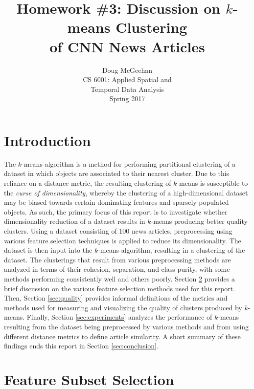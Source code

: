 \documentclass[11pt]{article}
\title{Homework \#3: Discussion on $k$-means Clustering\\ of CNN News Articles}
\author{Doug McGeehan\\
		CS 6001: Applied Spatial and \\ Temporal Data Analysis\\
		Spring 2017}
\begin{document}
\maketitle

\section{Introduction}

The $k$-means algorithm is a method for performing partitional clustering of a dataset in which objects are associated to their nearest cluster.
Due to this reliance on a distance metric, the resulting clustering of $k$-means is susceptible to the \emph{curse of dimensionality}, whereby the clustering of a high-dimensional dataset may be biased towards certain dominating features and sparsely-populated objects.
As such, the primary focus of this report is to investigate whether dimensionality reduction of a dataset results in $k$-means producing better quality clusters.
Using a dataset consisting of 100 news articles, preprocessing using various feature selection techniques is applied to reduce its dimensionality.
The dataset is then input into the $k$-means algorithm, resulting in a clustering of the dataset.
The clusterings that result from various preprocessing methods are analyzed in terms of their cohesion, separation, and class purity, with some methods performing consistently well and others poorly.
Section \ref{sec:feature_selection} provides a brief discussion on the various feature selection methods used for this report.
Then, Section \ref{sec:quality} provides informal definitions of the metrics and methods used for measuring and visualizing the quality of clusters produced by $k$-means.
Finally, Section \ref{sec:experiments} analyzes the performance of $k$-means resulting from the dataset being preprocessed by various methods and from using different distance metrics to define article similarity.
A short summary of these findings ends this report in Section \ref{sec:conclusion}.


\section{Feature Subset Selection} \label{sec:feature_selection}
\end{document}
